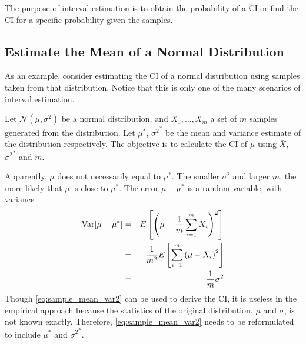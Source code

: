 The purpose of interval estimation is to obtain the probability of a CI or find the CI for a specific probability given the samples.

\subsection{Estimate the Mean of a Normal Distribution}

As an example, consider estimating the CI of a normal distribution using samples taken from that distribution. Notice that this is only one of the many scenarios of interval estimation.

Let $\mathcal{N}(\mu,\sigma^2)$ be a normal distribution, and $X_1, \ldots, X_m$ a set of $m$ samples generated from the distribution. Let $\mu^*$, ${\sigma^2}^*$ be the mean and variance estimate of the distribution respectively. The objective is to calculate the CI of $\mu$ using $\bar{X}$, ${\sigma^2}^*$ and $m$.

Apparently, $\mu$ does not necessarily equal to $\mu^*$. The smaller $\sigma^2$ and larger $m$, the more likely that $\mu$ is close to $\mu^*$. The error $\mu - \mu^*$ is a random variable, with variance
\begin{eqnarray}
	\textup{Var}[\mu-\mu^*] &=& E\left[\left(\mu-\dfrac{1}{m}\sum_{i=1}^{m} X_i\right)^2\right] \nonumber \\
	&=& \dfrac{1}{m^2}E\left[\sum_{i=1}^{m}\left(\mu-X_i\right)^2\right] \label{eq:sample_mean_var1} \\
	&=& \dfrac{1}{m}\sigma^2 \label{eq:sample_mean_var2}
\end{eqnarray}
Though \eqref{eq:sample_mean_var2} can be used to derive the CI, it is useless in the empirical approach because the statistics of the original distribution, $\mu$ and $\sigma$, is not known exactly. Therefore, \eqref{eq:sample_mean_var2} needs to be reformulated to include $\mu^*$ and ${\sigma^2}^*$.

